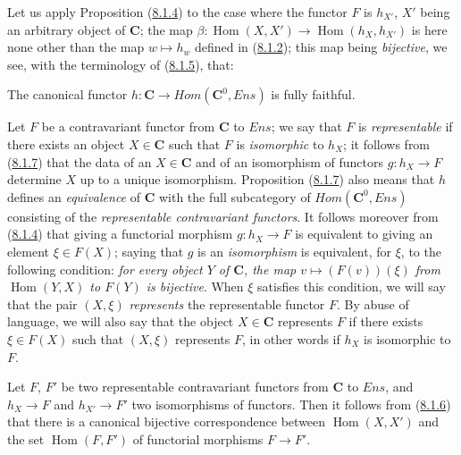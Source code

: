 \begin{env}[8.1.6]
\label{0.8.1.6}
Let us apply Proposition (\hyperref[0.8.1.4]{8.1.4}) to the case where the
functor $F$ is $h_{X'}$, $X'$ being an arbitrary object of $\boldsymbol{C}$; the map
$\beta:\operatorname{Hom}(X,X')\to\operatorname{Hom}(h_X,h_{X'})$ is here
none other than the map $w\mapsto h_w$ defined in
(\hyperref[0.8.1.2]{8.1.2}); this map being \emph{bijective},
we see, with the terminology of (\hyperref[0.8.1.5]{8.1.5}), that:
\end{env}

\begin{proposition}[8.1.7]
\label{0.8.1.7}
The canonical functor
$h:\boldsymbol{C}\to\boldsymbol{\mathit{Hom}}(\boldsymbol{C}^0,\boldsymbol{\mathit{Ens}})$ is fully faithful.
\end{proposition}

\begin{env}[8.1.8]
\label{0.8.1.8}
Let $F$ be a contravariant functor from $\boldsymbol{C}$ to $\boldsymbol{\mathit{Ens}}$; we say that
$F$ is \emph{representable} if there exists an object $X\in\boldsymbol{C}$ such that $F$
is \emph{isomorphic} to $h_X$; it follows from
(\hyperref[0.8.1.7]{8.1.7}) that the data of an $X\in\boldsymbol{C}$ and of an
isomorphism of functors $g:h_X\to F$ determine $X$ up to a unique
isomorphism. Proposition (\hyperref[0.8.1.7]{8.1.7}) also means that $h$
defines an \emph{equivalence} of $\boldsymbol{C}$ with the full subcategory of
$\boldsymbol{\mathit{Hom}}(\boldsymbol{C}^0,\boldsymbol{\mathit{Ens}})$ consisting of the \emph{representable
contravariant functors}. It follows moreover from
(\hyperref[0.8.1.4]{8.1.4}) that giving a functorial morphism
$g:h_X\to F$ is equivalent to giving an element $\xi\in F(X)$; saying that
$g$ is an \emph{isomorphism} is equivalent, for $\xi$, to the following
condition: \emph{for every object $Y$ of $\boldsymbol{C}$, the map
$v\mapsto(F(v))(\xi)$ from $\operatorname{Hom}(Y,X)$ to $F(Y)$ is
bijective}. When $\xi$ satisfies this condition, we will say that the pair
$(X,\xi)$ \emph{represents} the representable functor $F$. By abuse of
language, we will also say that the object $X\in\boldsymbol{C}$ represents $F$ if there
exists $\xi\in F(X)$ such that $(X,\xi)$ represents $F$, in other words if
$h_X$ is isomorphic to $F$.

Let $F$, $F'$ be two representable contravariant functors from $\boldsymbol{C}$ to
$\boldsymbol{\mathit{Ens}}$, and $h_X\to F$ and $h_{X'}\to F'$ two isomorphisms of
functors. Then it follows from (\hyperref[0.8.1.6]{8.1.6}) that there is a
canonical bijective correspondence between $\operatorname{Hom}(X,X')$ and
the set $\operatorname{Hom}(F,F')$ of functorial morphisms $F\to F'$.
\end{env}

